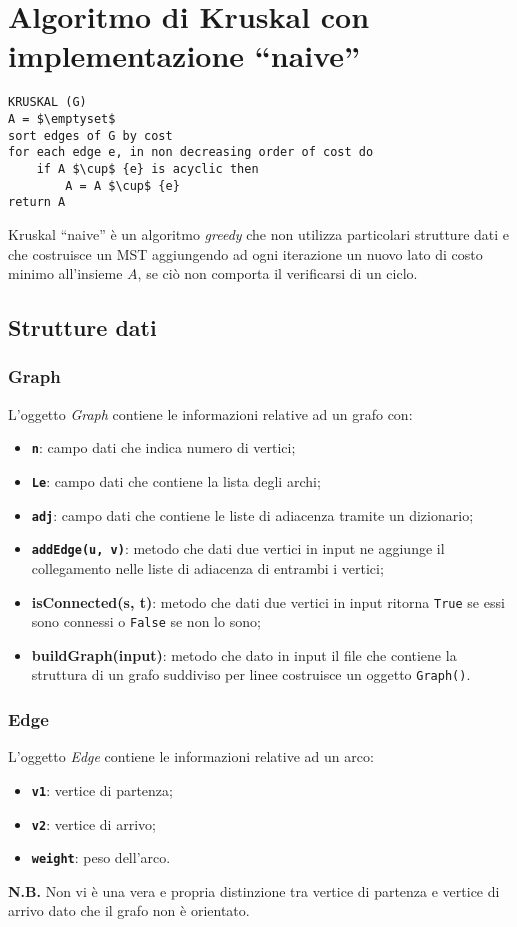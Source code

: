 \section{Algoritmo di Kruskal con implementazione ``naive''}\label{kruskal_naive}

\begin{lstlisting}[mathescape=true]
KRUSKAL (G)
A = $\emptyset$
sort edges of G by cost
for each edge e, in non decreasing order of cost do
	if A $\cup$ {e} is acyclic then
		A = A $\cup$ {e}
return A	
\end{lstlisting}

Kruskal ``naive'' è un algoritmo \textit{greedy} che non utilizza particolari strutture dati e che costruisce un MST aggiungendo ad ogni iterazione un nuovo lato di costo minimo all'insieme $A$, se ciò non comporta il verificarsi di un ciclo.

\subsection{Strutture dati}
	\subsubsection{Graph}\label{kruskal_naive_graph}
	L'oggetto \textit{Graph} contiene le informazioni relative ad un grafo con:
	\begin{itemize}
		\item \texttt{\textbf{n}}: campo dati che indica numero di vertici;
		\item \texttt{\textbf{Le}}: campo dati che contiene la lista degli archi;
		\item \texttt{\textbf{adj}}: campo dati che contiene le liste di adiacenza tramite un dizionario;
		\item \texttt{\textbf{addEdge(u, v)}}: metodo che dati due vertici in input ne aggiunge il collegamento nelle liste di adiacenza di entrambi i vertici;
		\item \textbf{isConnected(s, t)}: metodo che dati due vertici in input ritorna \texttt{True} se essi sono connessi o \texttt{False} se non lo sono;
		\item \textbf{buildGraph(input)}: metodo che dato in input il file che contiene la struttura di un grafo suddiviso per linee costruisce un oggetto \texttt{Graph()}.
	\end{itemize} 

	\subsubsection{Edge}\label{kruskal_naive_edge}
		L'oggetto \textit{Edge} contiene le informazioni relative ad un arco:
		\begin{itemize}
			\item \texttt{\textbf{v1}}: vertice di partenza;
			\item \texttt{\textbf{v2}}: vertice di arrivo;
			\item \texttt{\textbf{weight}}: peso dell'arco.
		\end{itemize}
		\textbf{N.B.} Non vi è una vera e propria distinzione tra vertice di partenza e vertice di arrivo dato che il grafo non è orientato.

